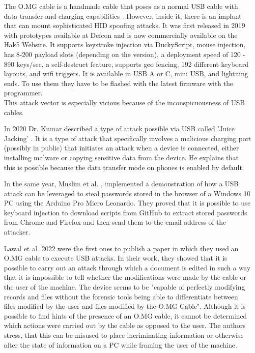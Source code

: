 The O.MG cable is a handmade cable that poses as a normal USB cable with data transfer and charging capabilities \cite{hak5MGCable}. However, inside it, there is an implant that can mount sophisticated HID spoofing attacks. It was first released in 2019 with prototypes available at Defcon \cite{MGCable2019a} and is now commercially available on the Hak5 Website. It supports keystroke injection via DuckyScript, mouse injection, has 8-200 payload slots (depending on the version), a deployment speed of 120 - 890 keys/sec, a self-destruct feature, supports geo fencing, 192 different keyboard layouts, and wifi triggers. It is available in USB A or C, mini USB, and lightning ends. To use them they have to be flashed with the latest firmware with the programmer. \\
This attack vector is especially vicious because of the inconspicuousness of USB cables.  

In 2020 Dr. Kumar described a type of attack possible via USB called 'Juice Jacking' \cite{kumarJuiceJackingUSB2020}. It is a type of attack that specifically involves a malicious charging port (possibly in public) that initiates an attack when a device is connected, either installing malware or copying sensitive data from the device. He explains that this is possible because the data transfer mode on phones is enabled by default. 

In the same year, Muslim et al. \cite{muslimImplementationAnalysisUSB2020}, implemented a demonstration of how a USB attack can be leveraged to steal passwords stored in the browser of a Windows 10 PC using the Arduino Pro Micro Leonardo. They proved that it is possible to use keyboard injection to download scripts from GitHub to extract stored passwords from Chrome and Firefox and then send them to the email address of the attacker. 

Lawal et al. \cite{lawalFacilitatingCyberenabledFraud2022} 2022 were the first ones to publish a paper in which they used an O.MG cable to execute USB attacks. In their work, they showed that it is possible to carry out an attack through which a document is edited in such a way that it is impossible to tell whether the modifications were made by the cable or the user of the machine. The device seems to be "capable of perfectly modifying records and files without the forensic tools being able to differentiate between files modified by the user and files modified by the O.MG Cable". Although it is possible to find hints of the presence of an O.MG cable, it cannot be determined which actions were carried out by the cable as opposed to the user. The authors stress, that this can be misused to place incriminating information or otherwise alter the state of information on a PC while framing the user of the machine. 


